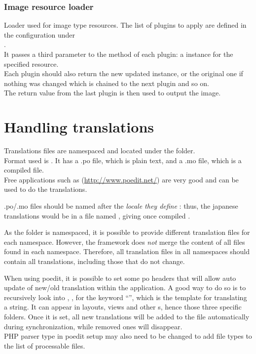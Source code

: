 \documentclass[pdftex,12pt,a4paper]{article}
\begin{document}
\subsubsection{Image resource loader} \label{sec:image-resource-loader}
Loader used for image type resources. The list of plugins to apply are defined in the configuration under\\
.\\
It passes a third parameter to the  method of each plugin: a  instance for the specified resource.\\
Each plugin should also return the new updated  instance, or the original one if nothing was changed which is chained to the next plugin and so on.\\
The return value from the last plugin is then used to output the image.


\section{Handling translations} \label{sec:handling-translations}

Translations files are namespaced and located under the  folder.\\
Format used is . It has a .po file, which is plain text, and a .mo file, which is a  compiled file.\\
Free applications such as  (\url{http://www.poedit.net/}) are very good and can be used to do the translations.

.po/.mo files should be named after the \emph{locale they define} : thus, the japanese translations would be in a file named , giving once compiled .

As the  folder is namespaced, it is possible to provide different translation files for each namespace. However, the framework does \emph{not} merge the content of all files found in each namespace.
Therefore, all translation files in all namespaces should contain all translations, including those that do not change.

\begin{note}
When using poedit, it is possible to set some po headers that will allow auto update of new/old translation within the application. A good way to do so is to recursively look into  , ,  for the keyword ``'', which is the template  for translating a string. It can appear in layouts, views and other s, hence those three specific folders. Once it is set, all new translations will be added to the file automatically during synchronization, while removed ones will disappear.\\
PHP parser type in poedit setup may also need to be changed to add  file types to the list of processable files.
\end{note}
\end{document}
